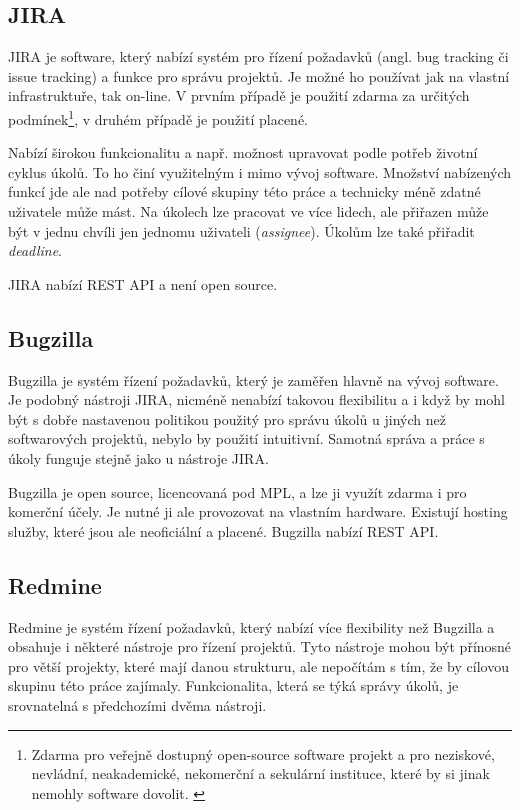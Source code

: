\documentclass[thesis=B,czech]{FITthesis}[2012/06/26]
\begin{document}
		\subsection{JIRA}
			JIRA \cite{jira} je software, který nabízí systém pro řízení požadavků (angl. bug tracking či issue tracking) a funkce pro správu projektů. Je možné ho používat jak na vlastní infrastruktuře, tak on-line. V prvním případě je použití zdarma za určitých podmínek\footnote{Zdarma pro veřejně dostupný open-source software projekt\cite{jira-lic-opensource} a pro neziskové, nevládní, neakademické, nekomerční a sekulární instituce, které by si jinak nemohly software dovolit. \cite{jira-lic-nonprofit}}, v druhém případě je použití placené. 
			
			Nabízí širokou funkcionalitu a např. možnost upravovat podle potřeb životní cyklus úkolů. To ho činí využitelným i mimo vývoj software. Množství nabízených funkcí jde ale nad potřeby cílové skupiny této práce a technicky méně zdatné uživatele může mást. Na úkolech lze pracovat ve více lidech, ale přiřazen může být v jednu chvíli jen jednomu uživateli (\textit{assignee}). Úkolům lze také přiřadit \textit{deadline}.
			
			JIRA nabízí REST API a není open source.
			
		\subsection{Bugzilla}
			Bugzilla \cite{bugzilla} je systém řízení požadavků, který je zaměřen hlavně na vývoj software. Je podobný nástroji JIRA, nicméně nenabízí takovou flexibilitu a i když by mohl být s dobře nastavenou politikou použitý pro správu úkolů u jiných než softwarových projektů, nebylo by použití intuitivní. Samotná správa a práce s úkoly funguje stejně jako u nástroje JIRA.
			
			Bugzilla je open source, licencovaná pod MPL, a lze ji využít zdarma i pro komerční účely. Je nutné ji ale provozovat na vlastním hardware. Existují hosting služby, které jsou ale neoficiální a placené. Bugzilla nabízí REST API.
			
		\subsection{Redmine}		
			Redmine \cite{redmine} je systém řízení požadavků, který nabízí více flexibility než Bugzilla a obsahuje i některé nástroje pro řízení projektů. Tyto nástroje mohou být přínosné pro větší projekty, které mají danou strukturu, ale nepočítám s tím, že by cílovou skupinu této práce zajímaly. Funkcionalita, která se týká správy úkolů, je srovnatelná s předchozími dvěma nástroji.
			
\end{document}
